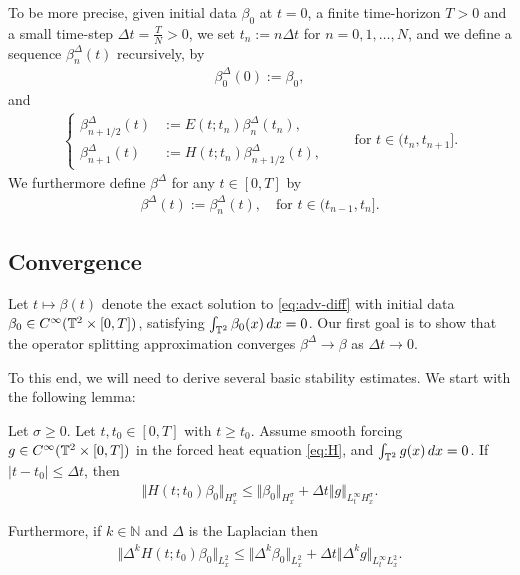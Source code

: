 \documentclass[reqno,12pt]{amsart}
\begin{document}
To be more precise, given initial data $\beta_0$ at $t=0$, a finite time-horizon $T>0$ and a small time-step $\Delta t = \displaystyle{\frac{T}{N}} > 0$, we set $t_n:= n\Delta t$ for $n=0,1,\ldots, N$, and we define a sequence ${\beta}^{\Delta}_n(t)$ recursively, by
\begin{align}
  \label{eq:opspl1}
{\beta}^{\Delta}_0(0) := \beta_0,
\end{align}
and
\begin{align}
  \label{eq:opspl2}
  \left\{
  \begin{aligned}
{\beta}^{\Delta}_{n+1/2}(t)
&:=
E(t;t_n) {\beta}^{\Delta}_n(t_n),
\\
{\beta}^{\Delta}_{n+1}(t)
&:=
H(t;t_n) {\beta}^{\Delta}_{n+1/2}(t),
\end{aligned}
\right.
\qquad
\text{for } t \in (t_n,t_{n+1}].
\end{align}
We furthermore define ${\beta}^{\Delta}$ for any $t\in [0,T]$ by
\begin{align}
\label{eq:opspl3}
{\beta}^{\Delta}(t)
:=
{\beta}^{\Delta}_{n}(t),
\quad \text{for } t\in (t_{n-1},t_n].
\end{align}


\subsection{Convergence}
Let $t\mapsto \beta(t)$ denote the exact solution to \eqref{eq:adv-diff} with initial data $\beta_0 \in C^\infty(\mathbb{T}^2\times[0,T])$, satisfying $\int_{\mathbb{T}^2}\beta_0(x)\, dx =0$. Our first goal is to show that the operator splitting approximation converges ${\beta}^{\Delta} \to \beta$ as $\Delta t \to 0$.

To this end, we will need to derive several basic stability estimates. We start with the following lemma:

\begin{lemma}
\label{lem:Hstab}
Let $\sigma \ge 0$. Let $t,t_0\in [0,T]$ with $t\ge t_0$. Assume smooth forcing $g\in C^\infty(\mathbb{T}^2\times [0,T])$ in the forced heat equation \eqref{eq:H}, and $\int_{\mathbb{T}^2} g(x)\, dx = 0$. If $|t-t_0|\le \Delta t$, then
\begin{align}
\label{eq:Hstab}
\Vert H(t;t_0){\beta_0} \Vert_{H^\sigma_x}
\le
\Vert \beta_0 \Vert_{H^\sigma_x}
+
\Delta t \Vert g \Vert_{L^\infty_t H^\sigma_x}.
\end{align}

Furthermore, if $k  \in \mathbb{N}$ and $\Delta$ is the Laplacian then
\begin{align}
\label{eq:HstabL2}
\Vert \Delta^k H(t;t_0){\beta_0} \Vert_{L^2_x}
\le
\Vert \Delta^k \beta_0 \Vert_{L^2_x}
+
\Delta t \Vert \Delta^k g \Vert_{L^\infty_t L^2_x}.
\end{align}
\end{lemma}
\end{document}
